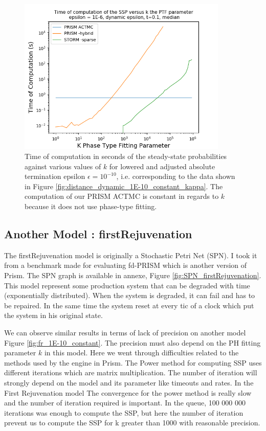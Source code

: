 \documentclass[runningheads,custombib]{llncs}
\begin{document}
	\begin{figure}
		\begin{center}
			\includegraphics[trim=0.2cm 0cm 0cm 1.35cm,width=10cm, clip]{../picture/New_model/1E-6/performance_dynamic.png}
		\end{center}
		\caption{Time of computation in seconds of the steady-state probabilities against various values of $k$ for lowered and adjusted absolute termination epsilon $\epsilon = 10^{-10}$, i.e. corresponding to the data shown in Figure \ref{fig:distance_dynamic_1E-10_constant_kappa}. The computation of our PRISM ACTMC is constant in regards to $k$ because it does not use phase-type fitting. }
		\label{fig:performance_dynamic}
	\end{figure}
	
	\subsection{Another Model : firstRejuvenation}
	The firstRejuvenation model \cite{German:2000:PAC:518204} is originally a Stochastic Petri Net (SPN). I took it from a benchmark \cite{benchmark} made for evaluating fd-PRISM which is another version of Prism. The SPN graph is available in annexe, Figure \ref{fig:SPN_firstRejuvenation}. This model represent some production system that can be degraded with time (exponentially distributed). When the system is degraded, it can fail and has to be repaired. In the same time the system reset at every tic of a clock which put the system in his original state. 
	
	We can observe similar results in terms of lack of precision on another model Figure \ref{fig:fr_1E-10_constant}. The precision must also depend on the PH fitting parameter $k$ in this model. Here we went through difficulties related to the methods used by the engine in Prism. The Power method for computing SSP uses different iterations which are matrix multiplication. The number of iteration will strongly depend on the model and its parameter like timeouts and rates. In the First Rejuvenation model The convergence for the power method is really slow and the number of iteration required is important. In the queue, 100 000 000 iterations was enough to compute the SSP, but here the number of iteration prevent us to compute the SSP for k greater than 1000 with reasonable precision.
	
\end{document}
